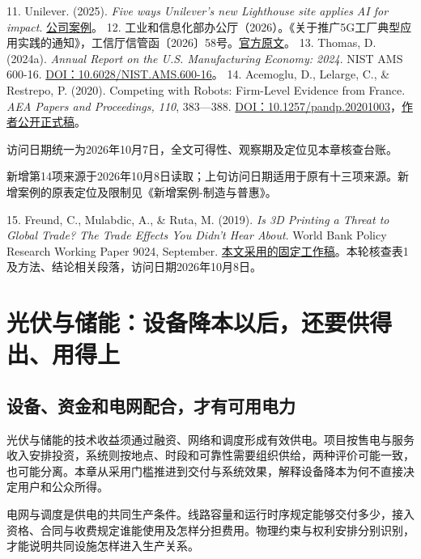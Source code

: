 \documentclass[UTF8,fontset=windows,12pt,a4paper,oneside,openany]{ctexbook}
\begin{document}
11. Unilever. (2025). \emph{Five ways Unilever’s new Lighthouse site applies AI for impact}. \href{https://www.unilever.com/news/news-search/2025/five-ways-unilevers-new-lighthouse-site-applies-ai-for-impact/}{公司案例}。
12. 工业和信息化部办公厅（2026）。《关于推广5G工厂典型应用实践的通知》，工信厅信管函〔2026〕58号。\href{https://www.miit.gov.cn/ztzl/rdzt/gyhlw/wjfb/art/2026/art_6b35987d001445d49487650795eac294.html}{官方原文}。
13. Thomas, D. (2024a). \emph{Annual Report on the U.S. Manufacturing Economy: 2024}. NIST AMS 600-16. \href{https://doi.org/10.6028/NIST.AMS.600-16}{DOI：10.6028/NIST.AMS.600-16}。
14. Acemoglu, D., Lelarge, C., \& Restrepo, P. (2020). Competing with Robots: Firm-Level Evidence from France. \emph{AEA Papers and Proceedings, 110}, 383—388. \href{https://doi.org/10.1257/pandp.20201003}{DOI：10.1257/pandp.20201003}，\href{https://economics.mit.edu/sites/default/files/publications/Competing\%20with\%20Robots\%20-\%20Firm-Level\%20Evidence\%20from\%20F.pdf}{作者公开正式稿}。

访问日期统一为2026年10月7日，全文可得性、观察期及定位见本章核查台账。

新增第14项来源于2026年10月8日读取；上句访问日期适用于原有十三项来源。新增案例的原表定位及限制见《新增案例-制造与普惠》。

15. Freund, C., Mulabdic, A., \& Ruta, M. (2019). \emph{Is 3D Printing a Threat to Global Trade? The Trade Effects You Didn’t Hear About}. World Bank Policy Research Working Paper 9024, September. \href{https://documents1.worldbank.org/curated/en/152701569432061451/pdf/Is-3D-Printing-a-Threat-to-Global-Trade-The-Trade-Effects-You-Didnt-Hear-About.pdf}{本文采用的固定工作稿}。本轮核查表1及方法、结论相关段落，访问日期2026年10月8日。

\chapter{光伏与储能：设备降本以后，还要供得出、用得上}\label{ch:9}

\section{设备、资金和电网配合，才有可用电力}

光伏与储能的技术收益须通过融资、网络和调度形成有效供电。项目按售电与服务收入安排投资，系统则按地点、时段和可靠性需要组织供给，两种评价可能一致，也可能分离。本章从采用门槛推进到交付与系统效果，解释设备降本为何不直接决定用户和公众所得。

电网与调度是供电的共同生产条件。线路容量和运行时序规定能够交付多少，接入资格、合同与收费规定谁能使用及怎样分担费用。物理约束与权利安排分别识别，才能说明共同设施怎样进入生产关系。
\end{document}
